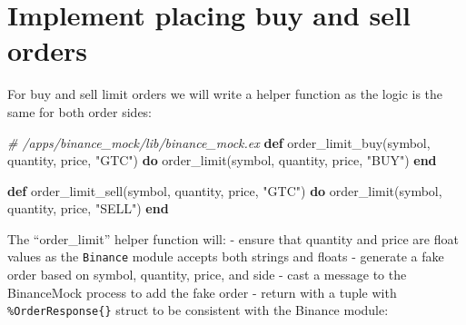 \documentclass[
]{book}
\newenvironment{Shaded}{\begin{snugshade}}{\end{snugshade}}
\newcommand{\CommentTok}[1]{\textcolor[rgb]{0.56,0.35,0.01}{\textit{#1}}}
\newcommand{\KeywordTok}[1]{\textcolor[rgb]{0.13,0.29,0.53}{\textbf{#1}}}
\newcommand{\NormalTok}[1]{#1}
\newcommand{\StringTok}[1]{\textcolor[rgb]{0.31,0.60,0.02}{#1}}
\begin{document}
\hypertarget{implement-placing-buy-and-sell-orders}{%
\section{Implement placing buy and sell orders}\label{implement-placing-buy-and-sell-orders}}

For buy and sell limit orders we will write a helper function as the logic is
the same for both order sides:

\begin{Shaded}
\begin{Highlighting}[]
\CommentTok{\# /apps/binance\_mock/lib/binance\_mock.ex}
  \KeywordTok{def}\NormalTok{ order\_limit\_buy(symbol, quantity, price, }\StringTok{"GTC"}\NormalTok{) }\KeywordTok{do}
\NormalTok{    order\_limit(symbol, quantity, price, }\StringTok{"BUY"}\NormalTok{)}
  \KeywordTok{end}

  \KeywordTok{def}\NormalTok{ order\_limit\_sell(symbol, quantity, price, }\StringTok{"GTC"}\NormalTok{) }\KeywordTok{do}
\NormalTok{    order\_limit(symbol, quantity, price, }\StringTok{"SELL"}\NormalTok{)}
  \KeywordTok{end}
\end{Highlighting}
\end{Shaded}

The ``order\_limit'' helper function will:
- ensure that quantity and price are float values as the \texttt{Binance} module accepts both strings and floats
- generate a fake order based on symbol, quantity, price, and side
- cast a message to the BinanceMock process to add the fake order
- return with a tuple with \texttt{\%OrderResponse\{\}} struct to be consistent with the Binance module:
\end{document}
